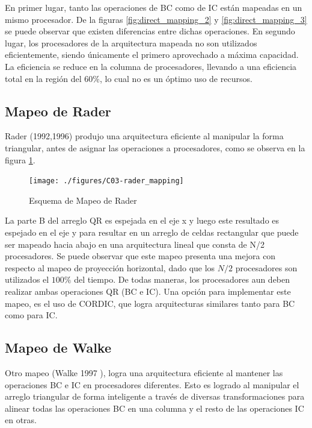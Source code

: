 En primer lugar, tanto las operaciones de BC como de IC están mapeadas en un mismo procesador. De la figuras \ref{fig:direct_mapping_2} y \ref{fig:direct_mapping_3} se puede observar que existen diferencias entre dichas operaciones. En segundo lugar, los procesadores de la arquitectura mapeada no son utilizados eficientemente, siendo únicamente el primero aprovechado a máxima capacidad. La eficiencia se reduce en la columna de procesadores, llevando a una eficiencia total en la región del $60\%$, lo cual no es un óptimo uso de recursos.

\newpage

\subsection{Mapeo de Rader}

Rader (1992,1996) produjo una arquitectura eficiente al manipular la forma triangular, antes de asignar las operaciones a procesadores, como se observa en la figura \ref{fig:rader_mapping}.

\begin{figure}[h!]
        \centering
        \texttt{[image: ./figures/C03-rader\_mapping]}
        \caption{Esquema de Mapeo de Rader}
        \label{fig:rader_mapping}
\end{figure}

La parte B del arreglo QR es espejada en el eje x y luego este resultado es espejado en el eje y para resultar en un arreglo de celdas rectangular que puede ser mapeado hacia abajo en una arquitectura lineal que consta de N/2 procesadores. Se puede observar que este mapeo presenta una mejora con respecto al mapeo de proyección horizontal, dado que los $N/2$ procesadores son utilizados el $100\%$ del tiempo. De todas maneras, los procesadores aun deben realizar ambas operaciones QR (BC e IC). Una opción para implementar este mapeo, es el uso de CORDIC, que logra arquitecturas similares tanto para BC como para IC.

\subsection{Mapeo de Walke}
\label{subsec:mapeo_de_walke}

Otro mapeo (Walke 1997 \cite{Walke}), logra una arquitectura eficiente al mantener las operaciones BC e IC en procesadores diferentes. Esto es logrado al manipular el arreglo triangular de forma inteligente a través de diversas transformaciones para alinear todas las operaciones BC en una columna y el resto de las operaciones IC en otras.


